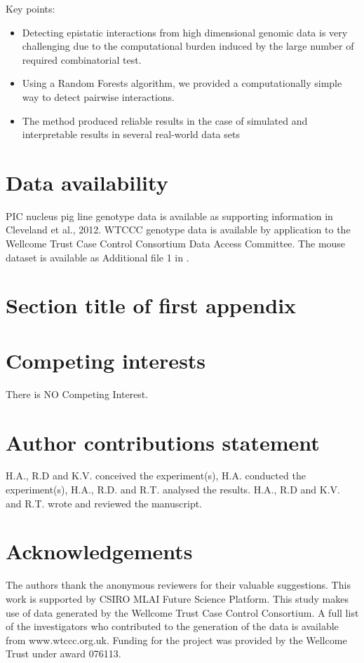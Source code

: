 \documentclass[authoryear,preprint,12pt,3p]{elsarticle}
\begin{document}
Key points:
\begin{itemize}
\item Detecting epistatic interactions from high dimensional genomic data is very challenging due to the computational
  burden induced by the large number of required combinatorial test.
\item Using a Random Forests algorithm, we provided a computationally simple way to detect pairwise interactions.
\item The method produced reliable results in the case of simulated and interpretable results in several real-world
  data sets
\end{itemize}




\section{Data availability}
PIC nucleus pig line genotype data is available as supporting information in Cleveland et al., 2012. WTCCC genotype data
is available by application to the Wellcome Trust Case Control Consortium Data Access Committee. The mouse dataset is
available as Additional file 1 in \cite{martiniGenomicPredictionEpistasis2017}.


\appendix

\FloatBarrier
\section{Section title of first appendix}
\label{sec11}




\section{Competing interests}
There is NO Competing Interest.

\section{Author contributions statement}
H.A., R.D and K.V. conceived the experiment(s), H.A. conducted
the experiment(s), H.A., R.D. and R.T. analysed the results.  H.A., R.D and K.V. and R.T.  wrote and reviewed the manuscript.

\section{Acknowledgements}
The authors thank the anonymous reviewers for their valuable suggestions. This work is supported by CSIRO MLAI Future
Science Platform. This study makes use of data generated by the Wellcome Trust Case Control Consortium. A full list of
the investigators who contributed to the generation of the data is available from www.wtccc.org.uk. Funding for the
project was provided by the Wellcome Trust under award 076113.




%
%




\end{document}
